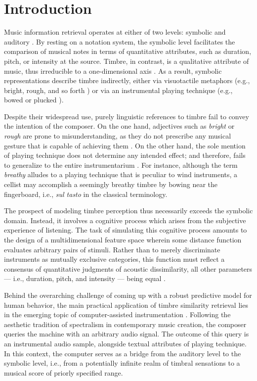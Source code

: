 \documentclass{bmcart}
\makeatletter
\newcommand*{\eg}{e.g.,\@\xspace}
\newcommand*{\ie}{i.e.,\@\xspace}
\makeatother
\begin{document}
\section*{Introduction}
\label{sec:intro}

Music information retrieval operates at either of two levels: symbolic and auditory \cite{downie2003mir}.
By resting on a notation system, the symbolic level facilitates the comparison of musical notes in terms of quantitative attributes, such as duration, pitch, or intensity at the source.
Timbre, in contrast, is a qualitative attribute of music, thus irreducible to a one-dimensional axis \cite{siedenburg2019chapter}.
As a result, symbolic representations describe timbre indirectly, either via visuotactile metaphors (\eg{} bright, rough, and so forth \cite{faure1996icmpc}) or via an instrumental playing technique (\eg{} bowed or plucked \cite{kostka2016book}).

Despite their widespread use, purely linguistic references to timbre fail to convey the intention of the composer.
On the one hand, adjectives such as \emph{bright} or \emph{rough} are prone to misunderstanding, as they do not prescribe any musical gesture that is capable of achieving them \cite{antoine2018isma}.
On the other hand, the sole mention of playing technique does not determine any intended effect; and therefore, fails to generalize to the entire instrumentarium \cite{kolozali2011ismir}.
For instance, although the term \emph{breathy} alludes to a playing technique that is peculiar to wind instruments, a cellist may accomplish a seemingly breathy timbre by bowing near the fingerboard, i.e., \emph{sul tasto} in the classical terminology.

The prospect of modeling timbre perception thus necessarily exceeds the symbolic domain.
Instead, it involves a cognitive process which arises from the subjective experience of listening. %
The task of simulating this cognitive process amounts to the design of a multidimensional feature space wherein some distance function evaluates arbitrary pairs of stimuli.
Rather than to merely discriminate instruments as mutually exclusive categories, this function must reflect a consensus of quantitative judgments of acoustic dissimilarity, all other parameters --- \ie{} duration, pitch, and intensity --- being equal \cite{thoret2018jasa}.

Behind the overarching challenge of coming up with a robust predictive model for human behavior, the main practical application of timbre similarity retrieval lies in the emerging topic of computer-assisted instrumentation \cite{maresz2013cmr}.
Following the aesthetic tradition of spectralism in contemporary music creation, the composer queries the machine with an arbitrary audio signal.
The outcome of this query is an instrumental audio sample, alongside textual attributes of playing technique.
In this context, the computer serves as a bridge from the auditory level to the symbolic level, \ie{} from a potentially infinite realm of timbral sensations to a musical score of priorly specified range.
\end{document}
